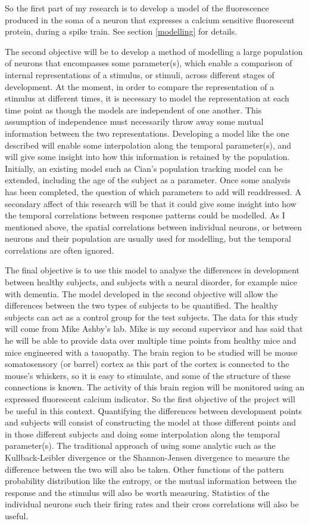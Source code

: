 \documentclass[a4paper,12pt]{article}
\theoremstyle{definition}
\begin{document}
	So the first part of my research is to develop a model of the fluorescence produced in the soma of a neuron that expresses a calcium sensitive fluorescent protein, during a spike train. See section \ref{modelling} for details. 
	
	The second objective will be to develop a method of modelling a large population of neurons that encompasses some parameter(s), which enable a comparison of internal representations of a stimulus, or stimuli, across different stages of development. At the moment, in order to compare the representation of a stimulus at different times, it is necessary to model the representation at each time point as though the models are independent of one another. This assumption of independence must necessarily throw away some mutual information between the two representations. Developing a model like the one described will enable some interpolation along the temporal parameter(s), and will give some insight into how this information is retained by the population. Initially, an existing model such as Cian's population tracking model can be extended, including the age of the subject as a parameter. Once some analysis has been completed, the question of which parameters to add will readdressed. A secondary affect of this research will be that it could give some insight into how the temporal correlations between response patterns could be modelled. As I mentioned above, the spatial correlations between individual neurons, or between neurons and their population are usually used for modelling, but the temporal correlations are often ignored.
	
	The final objective is to use this model to analyse the differences in development between healthy subjects, and subjects with a neural disorder, for example mice with dementia. The model developed in the second objective will allow the differences between the two types of subjects to be quantified. The healthy subjects can act as a control group for the test subjects. The data for this study will come from Mike Ashby's lab. Mike is my second supervisor and has said that he will be able to provide data over multiple time points from healthy mice and mice engineered with a tauopathy. The brain region to be studied will be mouse somatosensory (or barrel) cortex as this part of the cortex is connected to the mouse's whiskers, so it is easy to stimulate, and some of the structure of these connections is known. The activity of this brain region will be monitored using an expressed fluorescent calcium indicator. So the first objective of the project will be useful in this context. Quantifying the differences between development points and subjects will consist of constructing the model at those different points and in those different subjects and doing some interpolation along the temporal parameter(s). The traditional approach of using some analytic such as the Kullback-Leibler divergence or the Shannon-Jensen divergence to measure the difference between the two will also be taken. Other functions of the pattern probability distribution like the entropy, or the mutual information between the response and the stimulus will also be worth measuring. Statistics of the individual neurons such their firing rates and their cross correlations will also be useful.
\end{document}
